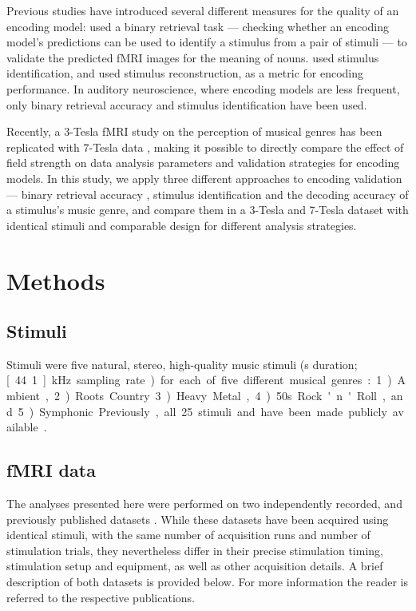 Previous studies have introduced several different measures for the quality of
an encoding model: \citet{ML08} used a binary retrieval task --- checking
whether an encoding model's predictions can be used to identify a stimulus from
a pair of stimuli --- to validate the predicted f{MRI} images for the meaning
of nouns. \citet{KG+08} used stimulus identification, and \citet{NG09} used
stimulus reconstruction, as a metric for encoding performance. In auditory
neuroscience, where encoding models are less frequent, only binary retrieval
accuracy \citep{CTK+2012} and stimulus identification \citep{SF14} have been
used.

Recently, a 3-Tesla f{MRI} study on the perception of musical genres
\citep{CTK+2012} has been replicated with 7-Tesla data \citep{HDH+2015}, making
it possible to directly compare the effect of field strength on data analysis
parameters and validation strategies for encoding models. In this study, we
apply three different approaches to encoding validation --- binary retrieval
accuracy \citep{ML08}, stimulus identification \citep{KG+08,SF14} and the
decoding accuracy of a stimulus's music genre, and compare them in a 3-Tesla
and 7-Tesla dataset with identical stimuli and comparable design for different
analysis strategies.


\section*{Methods}

\subsection*{Stimuli}

Stimuli were five natural, stereo, high-quality music stimuli (\unit[6]{s}
duration; \unit[44.1]{kHz} sampling rate) for each of five different musical
genres: 1) Ambient, 2) Roots Country 3) Heavy Metal, 4) 50s Rock'n'Roll, and 5)
Symphonic. Previously, all 25 stimuli and have been made publicly available
\citep{HDH+2015}.

\subsection*{fMRI data}

The analyses presented here were performed on two independently recorded, and
previously published datasets \citep{CTK+2012,HDH+2015} . While these datasets
have been acquired using identical stimuli, with the same number of acquisition
runs and number of stimulation trials, they nevertheless differ in their
precise stimulation timing, stimulation setup and equipment, as well as other
acquisition details. A brief description of both datasets is provided below.
For more information the reader is referred to the respective publications.

